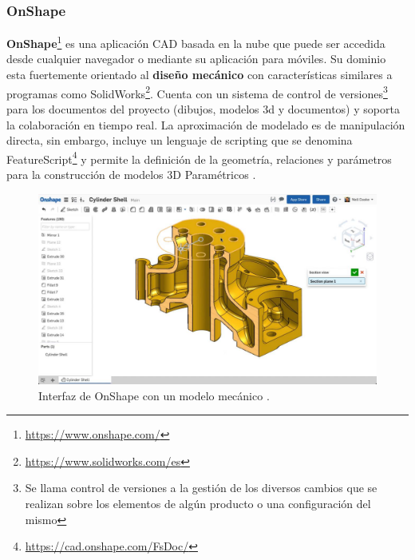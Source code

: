 \subsubsection{OnShape} 
\textbf{OnShape}\footnote{\url{https://www.onshape.com/}} es una aplicación CAD basada en la nube que puede ser accedida desde cualquier navegador o mediante su aplicación para móviles. Su dominio esta fuertemente orientado al \textbf{diseño mecánico} \citep{lardies2012criterios} con características similares a programas como SolidWorks\footnote{\url{https://www.solidworks.com/es}}. 
Cuenta con un sistema de control de versiones\footnote{Se llama control de versiones a la gestión de los diversos cambios que se realizan sobre los elementos de algún producto o una configuración del mismo} para los documentos del proyecto (dibujos, modelos 3d y documentos) y soporta la colaboración en tiempo real. La aproximación de modelado es de manipulación directa, sin embargo, incluye un lenguaje de scripting que se denomina FeatureScript\footnote{\url{https://cad.onshape.com/FsDoc/}} y permite la definición de la geometría, relaciones y parámetros para la construcción de modelos 3D Paramétricos \citep{Alfaiate2017}.

\begin{figure}[h]
\includegraphics[width=14cm]{Img/onshape.jpg}
\centering
\caption{\footnotesize{Interfaz de OnShape con un modelo mecánico \citep{OnshapePlanes}.}}
\end{figure}
